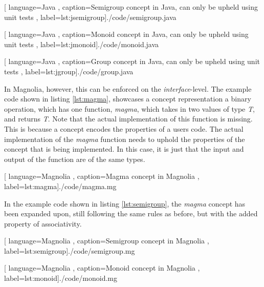 \begin{center}
  
    [ language=Java
    , caption={Semigroup concept in Java, can only be upheld using unit tests}
    , label=lst:jsemigroup]{./code/semigroup.java}
\end{center}

\begin{center}
  
    [ language=Java
    , caption={Monoid concept in Java, can only be upheld using unit tests}
    , label=lst:jmonoid]{./code/monoid.java}
\end{center}

\begin{center}
  
    [ language=Java
    , caption={Group concept in Java, can only be upheld using unit tests}
    , label=lst:jgroup]{./code/group.java}
\end{center}

In Magnolia, however, this can be enforced on the \textit{interface}-level. The
example code shown in listing \ref{lst:magma}, showcases a concept
representation a binary operation, which has one function, \textit{magma}, which
takes in two values of type \textit{T}, and returns \textit{T}. Note that the
actual implementation of this function is missing. This is because a concept
encodes the properties of a users code. The actual implementation of the
\textit{magma} function needs to uphold the properties of the concept that is
being implemented. In this case, it is just that the input and output
of the function are of the same types.

\begin{center}
  
    [ language=Magnolia
    , caption={Magma concept in Magnolia}
    , label=lst:magma]{./code/magma.mg}
\end{center}

In the example code shown in listing \ref{lst:semigroup}, the \textit{magma}
concept has been expanded upon, still following the same rules as before, but
with the added property of associativity.

\begin{center}
  
    [ language=Magnolia
    , caption={Semigroup concept in Magnolia}
    , label=lst:semigroup]{./code/semigroup.mg}
\end{center}

\begin{center}
  
    [ language=Magnolia
    , caption={Monoid concept in Magnolia}
    , label=lst:monoid]{./code/monoid.mg}
\end{center}

